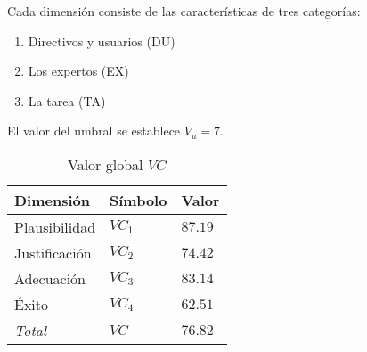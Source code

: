 \documentclass[a4paper,12pt]{article}
\begin{document}
\noindent Cada dimensión consiste de las características de tres categorías:
\begin{enumerate}
	\item Directivos y usuarios (DU)
	\item Los expertos (EX)
	\item La tarea (TA)
\end{enumerate}

\noindent El valor del umbral se establece $V_u = 7$.

\begin{table}[h]
	\centering
	\begin{tabular}{|l|l|l|}
		\hline
		Dimensión	   & Símbolo & Valor 	 \\ \hline
		Plausibilidad  & $VC_1$  & $87.19$   \\
		Justificación  & $VC_2$  & $74.42$   \\
		Adecuación     & $VC_3$  & $83.14$   \\
		Éxito          & $VC_4$  & $62.51$   \\ \hline
		\textit{Total} & $VC$    & $76.82$   \\ \hline
	\end{tabular}
	\caption{Valor global $VC$}
	\label{tab:total}
\end{table}
\end{document}
